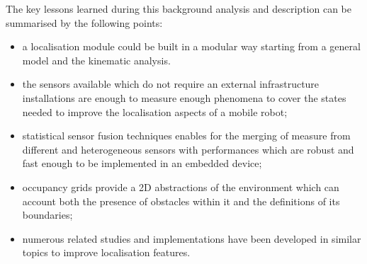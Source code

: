 \noindent The key lessons learned during this background analysis and description can be summarised by the following points:
\begin{itemize}
    \item a localisation module could be built in a modular way starting from a general model and the kinematic analysis.%
    \item the sensors available which do not require an external infrastructure installations are enough to measure enough phenomena to cover the states needed to improve the localisation aspects of a mobile robot;
    \item statistical sensor fusion techniques enables for the merging of measure from different and heterogeneous sensors with performances which are robust and fast enough to be implemented in an embedded device;
    \item occupancy grids provide a \gls{2D} abstractions of the environment which can account both the presence of obstacles within it and the definitions of its boundaries;
    \item numerous related studies and implementations have been developed in similar topics to improve localisation features.%
\end{itemize}



\cleardoublepage
